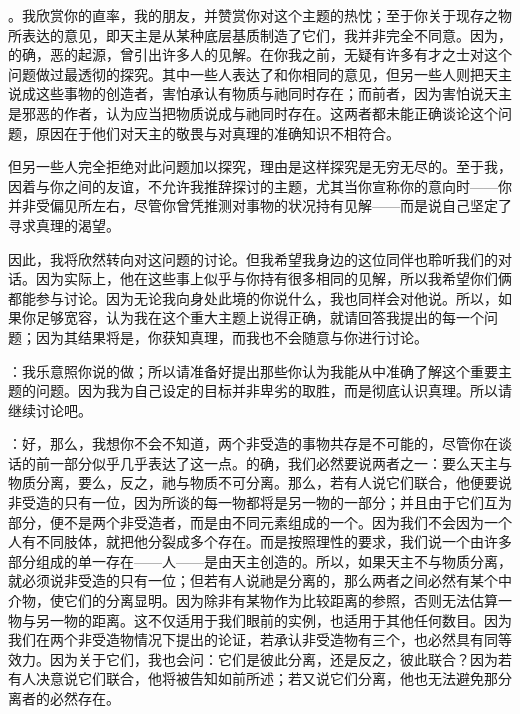 。我欣赏你的直率，我的朋友，并赞赏你对这个主题的热忱；至于你关于现存之物所表达的意见，即天主是从某种底层基质制造了它们，我并非完全不同意。因为，的确，恶的起源，曾引出许多人的见解。在你我之前，无疑有许多有才之士对这个问题做过最透彻的探究。其中一些人表达了和你相同的意见，但另一些人则把天主说成这些事物的创造者，害怕承认有物质与祂同时存在；而前者，因为害怕说天主是邪恶的作者，认为应当把物质说成与祂同时存在。这两者都未能正确谈论这个问题，原因在于他们对天主的敬畏与对真理的准确知识不相符合。\par

但另一些人完全拒绝对此问题加以探究，理由是这样探究是无穷无尽的。至于我，因着与你之间的友谊，不允许我推辞探讨的主题，尤其当你宣称你的意向时——你并非受偏见所左右，尽管你曾凭推测对事物的状况持有见解——而是说自己坚定了寻求真理的渴望。\par

因此，我将欣然转向对这问题的讨论。但我希望我身边的这位同伴也聆听我们的对话。因为实际上，他在这些事上似乎与你持有很多相同的见解，所以我希望你们俩都能参与讨论。因为无论我向身处此境的你说什么，我也同样会对他说。所以，如果你足够宽容，认为我在这个重大主题上说得正确，就请回答我提出的每一个问题；因为其结果将是，你获知真理，而我也不会随意与你进行讨论。\par

：我乐意照你说的做；所以请准备好提出那些你认为我能从中准确了解这个重要主题的问题。因为我为自己设定的目标并非卑劣的取胜，而是彻底认识真理。所以请继续讨论吧。\par

：好，那么，我想你不会不知道，两个非受造的事物共存是不可能的，尽管你在谈话的前一部分似乎几乎表达了这一点。的确，我们必然要说两者之一：要么天主与物质分离，要么，反之，祂与物质不可分离。那么，若有人说它们联合，他便要说非受造的只有一位，因为所谈的每一物都将是另一物的一部分；并且由于它们互为部分，便不是两个非受造者，而是由不同元素组成的一个。因为我们不会因为一个人有不同肢体，就把他分裂成多个存在。而是按照理性的要求，我们说一个由许多部分组成的单一存在——人——是由天主创造的。所以，如果天主不与物质分离，就必须说非受造的只有一位；但若有人说祂是分离的，那么两者之间必然有某个中介物，使它们的分离显明。因为除非有某物作为比较距离的参照，否则无法估算一物与另一物的距离。这不仅适用于我们眼前的实例，也适用于其他任何数目。因为我们在两个非受造物情况下提出的论证，若承认非受造物有三个，也必然具有同等效力。因为关于它们，我也会问：它们是彼此分离，还是反之，彼此联合？因为若有人决意说它们联合，他将被告知如前所述；若又说它们分离，他也无法避免那分离者的必然存在。\par


